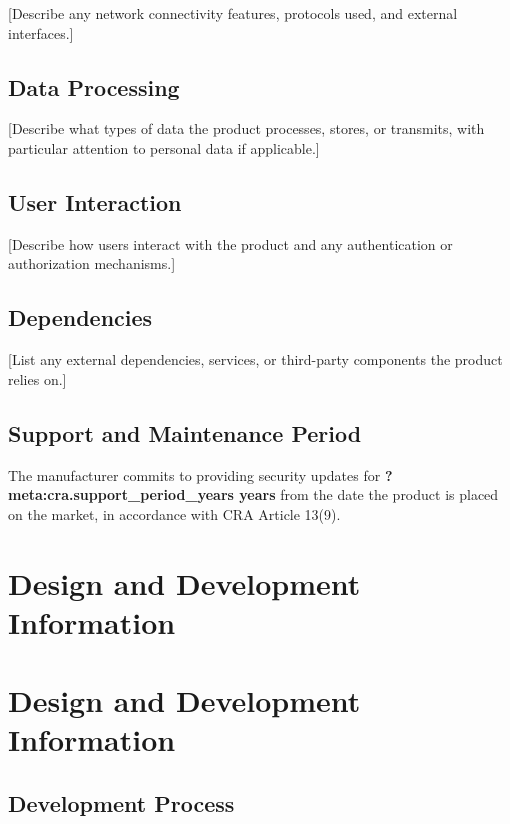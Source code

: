 \documentclass[
  11 pt,
  a4paper,
  table]{report}
\begin{document}
{[}Describe any network connectivity features, protocols used, and
external interfaces.{]}

\section{Data Processing}\label{data-processing}

{[}Describe what types of data the product processes, stores, or
transmits, with particular attention to personal data if applicable.{]}

\section{User Interaction}\label{user-interaction}

{[}Describe how users interact with the product and any authentication
or authorization mechanisms.{]}

\section{Dependencies}\label{dependencies}

{[}List any external dependencies, services, or third-party components
the product relies on.{]}

\section{Support and Maintenance
Period}\label{support-and-maintenance-period}

The manufacturer commits to providing security updates for
\textbf{\textbf{?meta:cra.support\_period\_years} years} from the date
the product is placed on the market, in accordance with CRA Article
13(9).


\chapter{Design and Development
Information}\label{design-and-development-information}


\chapter{Design and Development
Information}\label{design-and-development-information-1}

\section{Development Process}\label{development-process}
\end{document}
